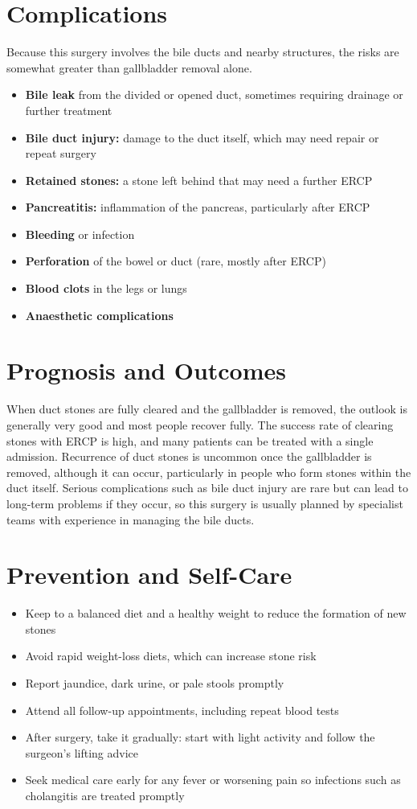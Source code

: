 \section*{Complications}
Because this surgery involves the bile ducts and nearby structures, the risks are somewhat greater than gallbladder removal alone.

\begin{itemize}
    \item \textbf{Bile leak} from the divided or opened duct, sometimes requiring drainage or further treatment
    \item \textbf{Bile duct injury:} damage to the duct itself, which may need repair or repeat surgery
    \item \textbf{Retained stones:} a stone left behind that may need a further ERCP
    \item \textbf{Pancreatitis:} inflammation of the pancreas, particularly after ERCP
    \item \textbf{Bleeding} or infection
    \item \textbf{Perforation} of the bowel or duct (rare, mostly after ERCP)
    \item \textbf{Blood clots} in the legs or lungs
    \item \textbf{Anaesthetic complications}
\end{itemize}

\section*{Prognosis and Outcomes}
When duct stones are fully cleared and the gallbladder is removed, the outlook is generally very good and most people recover fully. The success rate of clearing stones with ERCP is high, and many patients can be treated with a single admission. Recurrence of duct stones is uncommon once the gallbladder is removed, although it can occur, particularly in people who form stones within the duct itself. Serious complications such as bile duct injury are rare but can lead to long-term problems if they occur, so this surgery is usually planned by specialist teams with experience in managing the bile ducts.

\section*{Prevention and Self-Care}
\begin{itemize}
    \item Keep to a balanced diet and a healthy weight to reduce the formation of new stones
    \item Avoid rapid weight-loss diets, which can increase stone risk
    \item Report jaundice, dark urine, or pale stools promptly
    \item Attend all follow-up appointments, including repeat blood tests
    \item After surgery, take it gradually: start with light activity and follow the surgeon's lifting advice
    \item Seek medical care early for any fever or worsening pain so infections such as cholangitis are treated promptly
\end{itemize}

